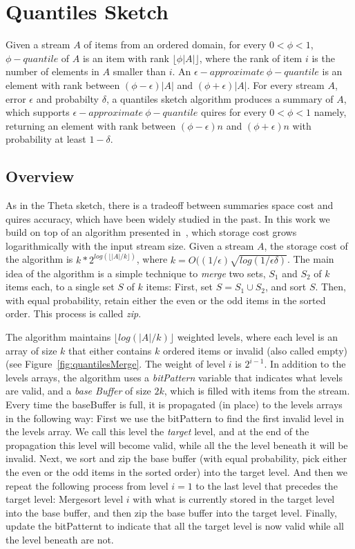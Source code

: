 \section{Quantiles Sketch}
\label{sec:quantiles}


Given a stream $A$ of items from an ordered domain, for every
$0< \phi < 1$, $\phi - quantile$ of $A$ is an item with rank 
$\lfloor \phi |A| \rfloor$, where the rank of item $i$ is the
number of elements in $A$ smaller than $i$.
An $\epsilon -approximate ~\phi - quantile$ is an element
with rank between $ (\phi - \epsilon) |A|$ and $ (\phi +
\epsilon) |A|$.
For every stream $A$, error $\epsilon$ and probabilty $\delta$,
a quantiles sketch algorithm produces a summary of $A$, which
supports $\epsilon -approximate ~\phi - quantile$ quires for
every $0< \phi < 1$ namely, returning an element with rank between $(\phi-\epsilon)n$ and  $(\phi+\epsilon)n$ with probability
at least $1 - \delta$.

\subsection{Overview}
As in the Theta sketch, there
is a tradeoff between summaries space cost and quires accuracy,
which have been widely studied in the past.
In this work we build on top of an algorithm presented
in~\cite{}, which storage cost grows logarithmically with the
input stream size.
Given a stream $A$, the storage cost of the algorithm is
$k*2^{log(\lfloor |A|/k \rfloor)}$, where $k = O((1/\epsilon)
\sqrt{log(1/\epsilon \delta)}$.
The main idea of the algorithm is a simple technique to
\emph{merge} two sets, $S_1$ and $S_2$ of $k$ items each, to a
single set $S$ of $k$ items:
First, set $S = S_1 \cup S_2$, and sort $S$. 
Then, with equal probability, retain either the even or the odd
items in the sorted order. 
This process is called \emph{zip}.


The algorithm maintains $\lfloor log(|A|/k) \rfloor$ weighted
levels, where each level is an array of size $k$ that either contains $k$ ordered
items or invalid (also called empty) (see Figure~\ref{fig:quantilesMerge}.
The weight of level $i$ is $2^{i-1}$.
In addition to the levels arrays, the algorithm uses a
\emph{bitPattern} variable that indicates what levels are valid,
and a \emph{base Buffer} of size $2k$, which is filled with items
from the stream.
Every time the baseBuffer is full, it is propagated (in place) to
the levels arrays in the following way:
First we use the bitPattern to find the first invalid level in
the levels array. 
We call this level the \emph{target} level, and at the end of
the propagation this level will become valid, while all the the
level beneath it will be invalid.
Next, we sort and zip the base buffer (with equal probability,
pick either the even or the odd items in the sorted order) into
the target level.
And then we repeat the following process from level $i=1$ to the
last level that precedes the target level:
Mergesort level $i$ with what is currently stored in the target
level into the base buffer, and then zip the base buffer into the
target level.
Finally, update the bitPatternt to indicate that all the target
level is now valid while all the level beneath are not.

